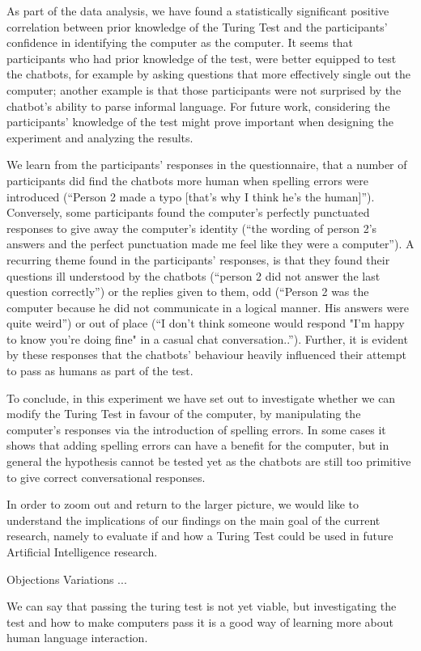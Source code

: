 As part of the data analysis, we have found a statistically significant positive correlation between prior knowledge of the Turing Test and the participants’ confidence in identifying the computer as the computer. It seems that participants who had prior knowledge of the test, were better equipped to test the chatbots, for example by asking questions that more effectively single out the computer; another example is that those participants were not surprised by the chatbot's ability to parse informal language. For future work, considering the participants’ knowledge of the test might prove important when designing the experiment and analyzing the results.

We learn from the participants’ responses in the questionnaire, that a number of participants did find the chatbots more human when spelling errors were introduced (“Person 2 made a typo [that’s why I think he’s the human]”). Conversely, some participants found the computer’s perfectly punctuated responses to give away the computer’s identity (“the wording of person 2's answers and the perfect punctuation made me feel like they were a computer”). A recurring theme found in the participants’ responses, is that they found their questions ill understood by the chatbots (“person 2 did not answer the last question correctly”) or the replies given to them, odd (“Person 2 was the computer because he did not communicate in a logical manner. His answers were quite weird”) or out of place (“I don't think someone would respond "I'm happy to know you're doing fine" in a casual chat conversation..”). Further, it is evident by these responses that the chatbots’ behaviour heavily influenced their attempt to pass as humans as part of the test.

To conclude, in this experiment we have set out to investigate whether we can modify the Turing Test in favour of the computer, by manipulating the computer’s responses via the introduction of spelling errors. In some cases it shows that adding spelling errors can have a benefit for the computer, but in general the hypothesis cannot be tested yet as the chatbots are still too primitive to give correct conversational responses.

In order to zoom out and return to the larger picture, we would like to understand the implications of our findings on the main goal of the current research, namely to evaluate if and how a Turing Test could be used in future Artificial Intelligence research.

Objections
Variations
...

We can say that passing the turing test is not yet viable, but investigating the test and how to make computers pass it is a good way of learning more about human language interaction.
